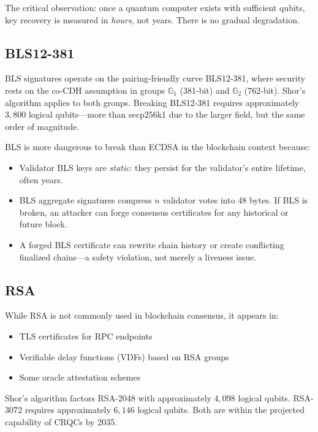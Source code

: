 The critical observation: once a quantum computer exists with sufficient qubits, key
recovery is measured in \emph{hours}, not years. There is no gradual degradation.

\subsection{BLS12-381}

BLS signatures operate on the pairing-friendly curve BLS12-381, where security rests
on the co-CDH assumption in groups $\mathbb{G}_1$ (381-bit) and $\mathbb{G}_2$
(762-bit). Shor's algorithm applies to both groups. Breaking BLS12-381 requires
approximately $3{,}800$ logical qubits---more than secp256k1 due to the larger
field, but the same order of magnitude.

BLS is more dangerous to break than ECDSA in the blockchain context because:
\begin{itemize}[leftmargin=2em]
  \item Validator BLS keys are \emph{static}: they persist for the validator's
        entire lifetime, often years.
  \item BLS aggregate signatures compress $n$ validator votes into 48 bytes. If BLS
        is broken, an attacker can forge consensus certificates for any historical or
        future block.
  \item A forged BLS certificate can rewrite chain history or create conflicting
        finalized chains---a safety violation, not merely a liveness issue.
\end{itemize}

\subsection{RSA}

While RSA is not commonly used in blockchain consensus, it appears in:
\begin{itemize}[leftmargin=2em]
  \item TLS certificates for RPC endpoints
  \item Verifiable delay functions (VDFs) based on RSA groups
  \item Some oracle attestation schemes
\end{itemize}

Shor's algorithm factors RSA-2048 with approximately $4{,}098$ logical qubits.
RSA-3072 requires approximately $6{,}146$ logical qubits. Both are within the
projected capability of CRQCs by 2035.

